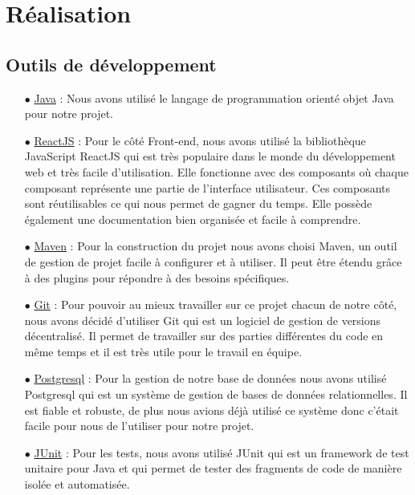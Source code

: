 \documentclass[a4paper]{report}
\begin{document}
\chapter{Réalisation}

\section{Outils de développement}

\begin{itemize}
    \item[$\bullet$] \underline{Java} : Nous avons utilisé le langage de programmation orienté objet Java pour notre projet.\newline
    \item[$\bullet$] \underline{ReactJS} : Pour le côté Front-end, nous avons utilisé la bibliothèque JavaScript ReactJS qui est très populaire dans le monde du développement web et 
    très facile d'utilisation. Elle fonctionne avec des composants où chaque composant représente une partie de l'interface utilisateur. Ces composants sont réutilisables ce qui nous permet de gagner du temps. 
    Elle possède également une documentation bien organisée et facile à comprendre. \newline
    \item[$\bullet$] \underline{Maven} : Pour la construction du projet nous avons choisi Maven, un outil de gestion de projet facile à configurer et à utiliser. Il peut être étendu grâce à des plugins pour répondre à des besoins spécifiques. \newline
    \item[$\bullet$] \underline{Git} : Pour pouvoir au mieux travailler sur ce projet chacun de notre côté, nous avons décidé d'utiliser Git qui est un logiciel de gestion de versions décentralisé. Il permet de travailler
    sur des parties différentes du code en même temps et il est très utile pour le travail en équipe.  \newline
    \item[$\bullet$] \underline{Postgresql} : Pour la gestion de notre base de données nous avons utilisé Postgresql qui est un système de gestion de bases de données relationnelles. Il est fiable et robuste, de plus 
    nous avions déjà utilisé ce système donc c'était facile pour nous de l'utiliser pour notre projet. \newline
    \item[$\bullet$] \underline{JUnit} : Pour les tests, nous avons utilisé JUnit qui est un framework de test unitaire pour Java et qui permet de tester des fragments de code de manière isolée et automatisée.\newline
\end{itemize}
\end{document}
